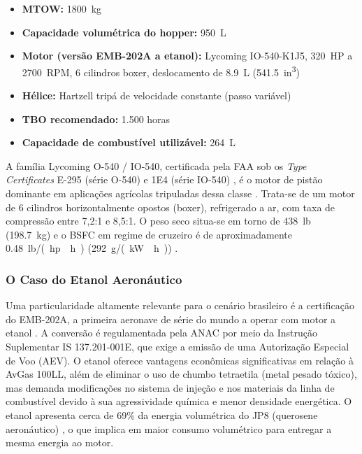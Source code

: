 \documentclass[a4paper,12pt]{article}
\begin{document}
\begin{itemize}
    \item \textbf{MTOW:} \SI{1800}{kg}
    \item \textbf{Capacidade volumétrica do hopper:} \SI{950}{L}
    \item \textbf{Motor (versão EMB-202A a etanol):} Lycoming IO-540-K1J5, \SI{320}{HP} a \SI{2700}{RPM}, 6 cilindros boxer, deslocamento de \SI{8.9}{L} (\SI{541.5}{in^3})
    \item \textbf{Hélice:} Hartzell tripá de velocidade constante (passo variável)
    \item \textbf{TBO recomendado:} 1.500 horas
    \item \textbf{Capacidade de combustível utilizável:} \SI{264}{L}
\end{itemize}

A família Lycoming O-540 / IO-540, certificada pela FAA sob os \textit{Type Certificates} E-295 (série O-540) e 1E4 (série IO-540) \cite{faa_tcds_e295, faa_tcds_1e4}, é o motor de pistão dominante em aplicações agrícolas tripuladas dessa classe \cite{lycomingmanual}. Trata-se de um motor de 6 cilindros horizontalmente opostos (boxer), refrigerado a ar, com taxa de compressão entre 7{,}2:1 e 8{,}5:1. O peso seco situa-se em torno de \SI{438}{lb} (\SI{198.7}{kg}) e o BSFC em regime de cruzeiro é de aproximadamente \SI{0.48}{lb/(hp \cdot h)} (\SI{292}{g/(kW \cdot h)}) \cite{lycomingmanual}.

\subsubsection{O Caso do Etanol Aeronáutico}

Uma particularidade altamente relevante para o cenário brasileiro é a certificação do EMB-202A, a primeira aeronave de série do mundo a operar com motor a etanol \cite{embraer202}. A conversão é regulamentada pela ANAC por meio da Instrução Suplementar IS 137.201-001E, que exige a emissão de uma Autorização Especial de Voo (AEV). O etanol oferece vantagens econômicas significativas em relação à AvGas 100LL, além de eliminar o uso de chumbo tetraetila (metal pesado tóxico), mas demanda modificações no sistema de injeção e nos materiais da linha de combustível devido à sua agressividade química e menor densidade energética. O etanol apresenta cerca de 69\% da energia volumétrica do JP8 (querosene aeronáutico) \cite{nas_army_fuels}, o que implica em maior consumo volumétrico para entregar a mesma energia ao motor.
\end{document}
